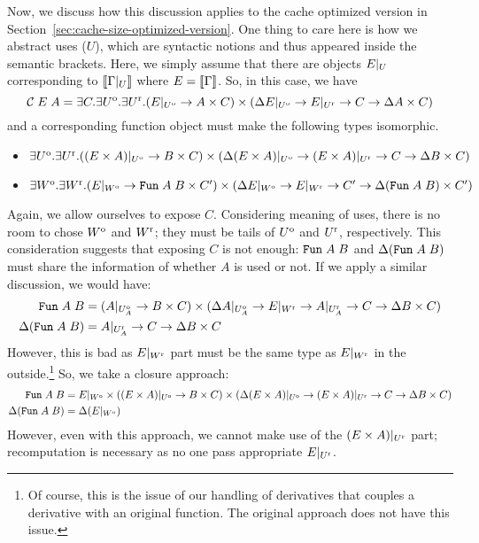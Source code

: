 \documentclass{article}
\theoremstyle{definition}
\begin{document}
Now, we discuss how this discussion applies to the cache optimized version in Section~\ref{sec:cache-size-optimized-version}.
One thing to care here is how we abstract uses ($U$), which are syntactic notions and thus appeared inside the semantic brackets. Here, we simply assume that there 
are objects $E|_{U}$ corresponding to $\sem{\Restrict{\Gamma}{U}}$ where $E = \sem{\Gamma}$.
So, in this case, we have 
\[
\mathcal{C} \; E \; A = \exists C. \exists U^\mathrm{o}. \exists U^\mathrm{r}. 
  (E|_{U^\mathrm{o}} \to {A} \times C) \times 
  (\Delta E|_{U^\mathrm{o}} \to E|_{U^\mathrm{r}} \to C \to \Delta A \times C)
\]
and a corresponding function object must make the following types isomorphic. 
\begin{itemize}
 \item \(
   \exists U^\mathrm{o}. \exists U^\mathrm{r}. 
   ((E \times A)|_{U^\mathrm{o}} \to {B} \times C) \times 
   (\Delta (E \times A)|_{U^\mathrm{o}} \to (E \times A)|_{U^\mathrm{r}} \to C \to \Delta B \times C)
   \) 
 \item \(
   \exists W^\mathrm{o}. \exists W^\mathrm{r}. 
   (E|_{W^\mathrm{o}} \to \texttt{Fun} \; A \; B \times C') \times 
   (\Delta E|_{W^\mathrm{o}} \to E|_{W^\mathrm{r}} \to C' \to \Delta (\texttt{Fun} \; A \; B) \times C')
   \)
\end{itemize} 
Again, we allow ourselves to expose $C$. 
Considering meaning of uses, there is no room to chose $W^\mathrm{o}$ and $W^\mathrm{r}$; they must be tails of $U^\mathrm{o}$ and $U^\mathrm{r}$, respectively. This consideration suggests
that exposing $C$ is not enough: $\texttt{Fun} \; A \; B$ and $\Delta (\texttt{Fun} \; A \; B)$ must share the information of whether $A$ is used or not.  
If we apply a similar discussion, we would have: 
\begin{align*}
\texttt{Fun} \; A \; B &= (A|_{U_A^\mathrm{o}} \to B \times C) \times (\Delta A|_{U_A^\mathrm{o}} \to E|_{W^\mathrm{r}} \to A|_{U_A^\mathrm{r}} \to C \to \Delta B \times C)\\
\Delta (\texttt{Fun} \; A \; B) &= A|_{U_A^\mathrm{r}} \to C \to \Delta B \times C
\end{align*}
However, this is bad as $E|_{W^\mathrm{r}}$ part must be the same type as $E|_{W^\mathrm{r}}$ in the outside.\footnote{
Of course, this is the issue of our handling of derivatives that couples a derivative with an original function. The original approach does not have this issue. 
} 
So, we take a closure approach: 
\begin{align*}
\texttt{Fun} \; A \; B &= E|_{W^\mathrm{o}} \times    
                ((E \times A)|_{U^\mathrm{o}} \to {B} \times C) \times 
                (\Delta (E \times A)|_{U^\mathrm{o}} \to (E \times A)|_{U^\mathrm{r}} \to C \to \Delta B \times C)\\
\Delta (\texttt{Fun} \; A \; B) &= \Delta (E|_{W^\mathrm{o}}) 
\end{align*}
However, even with this approach, we cannot make use of the $(E \times A)|_{U^\mathrm{r}}$ part; recomputation is necessary as no one pass appropriate $E|_{U^\mathrm{r}}$.
\end{document}
